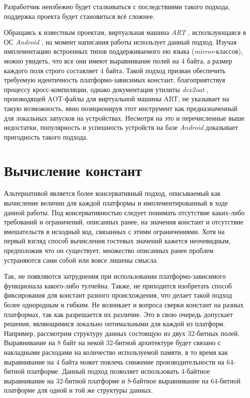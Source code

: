 Разработчик неизбежно будет сталкиваться с последствиями такого подхода, поддержка проекта будет становиться всё сложнее.
\par
Обращаясь к известным проектам, виртуальная машина \textit{ART} \cite{art}, использующаяся в ОС \textit{Android} \cite{android}, на момент написания работы использует данный подход.
Изучая имплементацию встроенных типов поддерживаемого ею языка (\textit{mirror}-классов), можно увидеть, что все они имеют выравнивание полей на 4 байта, а размер каждого поля строго составляет 4 байта.
Такой подход призван обеспечить требуемую идентичность платформо-зависимых констант, благоприятствуя процессу кросс-компиляции, однако документация утилиты \textit{dex2oat} \cite{dex2oat}, производящей AOT-файлы для виртуальной машины ART, не указывает на такую возможность, явно позиционируя этот инструмент как предназначенный для локальных запусков на устройствах.
Несмотря на это и перечисленные выше недостатки, популярность и успешность устройств на базе \textit{Android} доказывает пригодность такого подхода.
\section{Вычисление констант}

Альтернативой является более консервативный подход, описываемый как вычисление величин для каждой платформы и имплементированный в ходе данной работы.
Под консервативностью следует понимать отсутствие каких-либо требований и ограничений, описанных ранее, на значения констант и отсутствие вмешательств в исходный код, связанных с этими ограничениями. Хотя на первый взгляд способ вычисления гостевых значений кажется неочевидным, предположив что он существует, множество описанных ранее проблем устраняются сами собой или вовсе лишены смысла.

\par
Так, не появляются затруднения при использовании платформо-зависимого функционала какого-либо тулчейна.
Также, не приходится изобретать способ фиксирования для констант разного происхождения, что делает такой подход более однородным и гибким.
Не возникает и вопроса сверки констант на разных платформах, так как разрешается их различие.
Это в свою очередь допускает решения, являющимися локально оптимальными для каждой из платформ.
Например, рассмотрим структуру данных состоящую из двух 32-битных полей. Выравнивание на 8 байт на некой 32-битной архитектуре будет связано с накладными расходами на количество используемой памяти, в то время как выравнивание на 4 байта может повлечь снижение производительности на 64-битной платформе.
Данный подход позволяет использовать 4-байтное выравнивание на 32-битной платформе и 8-байтное выравнивание на 64-битной платформе для одной и той же структуры данных.

